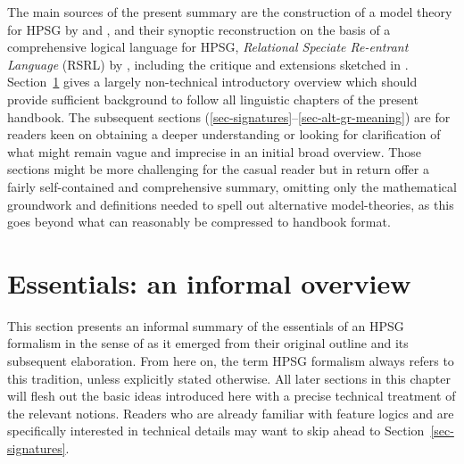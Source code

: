 \documentclass[output=paper
                ,modfonts
                ,nonflat
	        ,collection
	        ,collectionchapter
	        ,collectiontoclongg
 	        ,biblatex
                ,babelshorthands
                ,newtxmath
                ,draftmode
                ,colorlinks, citecolor=brown
]{./langsci/langscibook}
\begin{document}
{%

The main sources of the present summary are the construction of a
model theory for HPSG by \citet{King99a-u} and \citet{Pollard99a}, and
their synoptic reconstruction on the basis of a comprehensive logical
language for HPSG, \emph{Relational Speciate Re-entrant Language}
(RSRL) by \citet{Richter2004a-u}, including the critique and
extensions sketched in
\citet{Richter2007a}. Section~\ref{sec-essentials} gives a largely
non-technical introductory overview which should provide sufficient
background to follow all linguistic chapters of the present
handbook. The subsequent sections
(\ref{sec-signatures}--\ref{sec-alt-gr-meaning}) are for readers
keen on obtaining a deeper understanding or looking for clarification
of what might
remain vague and imprecise in an initial broad overview. Those sections
might be more challenging for the casual reader but in return offer a
fairly self-contained and comprehensive summary, omitting only
the mathematical groundwork and
definitions needed to spell out alternative
model-theories, as this goes beyond what can reasonably be compressed to
handbook format.


\section{Essentials: an informal overview}
\label{sec-essentials}


This section presents an informal summary of the essentials of an HPSG
formalism in the sense of \cite{PollardSag1994} as it emerged from their
original outline and its subsequent elaboration. From here on, the term
HPSG formalism always refers to this tradition, unless explicitly
stated otherwise.  All later sections in this chapter will flesh out
the basic ideas introduced here with a precise technical treatment of
the relevant notions. Readers who are already familiar with feature
logics and are specifically interested in technical details may want
to skip ahead to Section~\ref{sec-signatures}.

}
\end{document}
